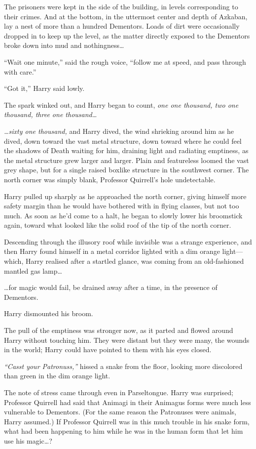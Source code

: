 The prisoners were kept in the side of the building, in levels
corresponding to their crimes. And at the bottom, in the uttermost
center and depth of Azkaban, lay a nest of more than a hundred
Dementors. Loads of dirt were occasionally dropped in to keep up the
level, as the matter directly exposed to the Dementors broke down into
mud and nothingness\ldots{}

``Wait one minute,'' said the rough voice, ``follow me at speed, and
pass through with care.''

``Got it,'' Harry said lowly.

The spark winked out, and Harry began to count, \emph{one one thousand,
two one thousand, three one thousand\ldots{}}

\emph{\ldots{}sixty one thousand,} and Harry dived, the wind shrieking
around him as he dived, down toward the vast metal structure, down
toward where he could feel the shadows of Death waiting for him,
draining light and radiating emptiness, as the metal structure grew
larger and larger. Plain and featureless loomed the vast grey shape, but
for a single raised boxlike structure in the southwest corner. The north
corner was simply blank, Professor Quirrell's hole undetectable.

Harry pulled up sharply as he approached the north corner, giving
himself more safety margin than he would have bothered with in flying
classes, but not too much. As soon as he'd come to a halt, he began to
slowly lower his broomstick again, toward what looked like the solid
roof of the tip of the north corner.

Descending through the illusory roof while invisible was a strange
experience, and then Harry found himself in a metal corridor lighted
with a dim orange light---which, Harry realised after a startled glance,
was coming from an old-fashioned mantled gas lamp\ldots{}

\ldots{}for magic would fail, be drained away after a time, in the
presence of Dementors.

Harry dismounted his broom.

The pull of the emptiness was stronger now, as it parted and flowed
around Harry without touching him. They were distant but they were many,
the wounds in the world; Harry could have pointed to them with his eyes
closed.

\emph{``Casst your Patronuss,''} hissed a snake from the floor, looking
more discolored than green in the dim orange light.

The note of stress came through even in Parseltongue. Harry was
surprised; Professor Quirrell had said that Animagi in their Animagus
forms were much less vulnerable to Dementors. (For the same reason the
Patronuses were animals, Harry assumed.) If Professor Quirrell was in
this much trouble in his snake form, what had been happening to him
while he was in the human form that let him use his magic\ldots{}?

